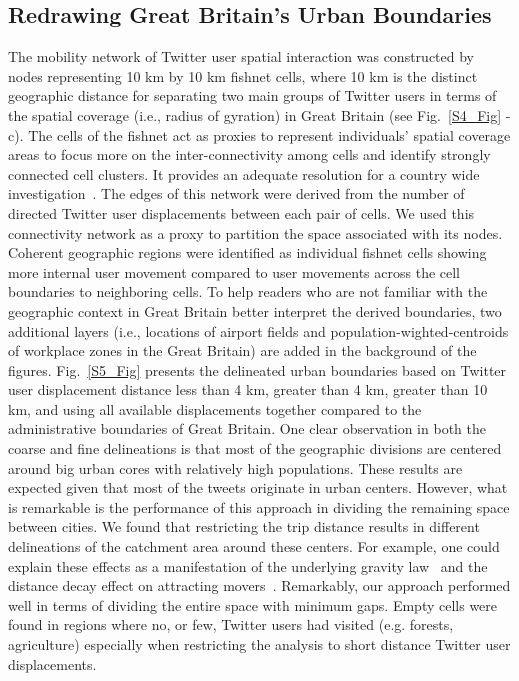 \documentclass[]{tGIS2e}
\begin{document}
\subsection{Redrawing Great Britain's Urban Boundaries}
The mobility network of Twitter user spatial interaction was constructed by nodes representing 10 km by 10 km fishnet cells, where 10 km is the distinct geographic distance for separating two main groups of Twitter users in terms of the spatial coverage (i.e., radius of gyration) in Great Britain (see Fig.~\ref{S4_Fig} - c).
The cells of the fishnet act as proxies to represent individuals' spatial coverage areas to focus more on the inter-connectivity among cells and identify strongly connected cell clusters.
It provides an adequate resolution for a country wide investigation~\citep{ratti2010}.
The edges of this network were derived from the number of directed Twitter user displacements between each pair of cells.
We used this connectivity network as a proxy to partition the space associated with its nodes.
Coherent geographic regions were identified as individual fishnet cells showing more internal user movement compared to user movements across the cell boundaries to neighboring cells.
To help readers who are not familiar with the geographic context in Great Britain better interpret the derived boundaries, two additional layers (i.e., locations of airport fields and population-wighted-centroids of workplace zones in the Great Britain) are added in the background of the figures.
Fig.~\ref{S5_Fig} presents the delineated urban boundaries based on Twitter user displacement distance less than 4 km, greater than 4 km, greater than 10 km, and using all available displacements together compared to the administrative boundaries of Great Britain.
One clear observation in both the coarse and fine delineations is that most of the geographic divisions are centered around big urban cores with relatively high populations.
These results are expected given that most of the tweets originate in urban centers.
However, what is remarkable is the performance of this approach in dividing the remaining space between cities.
We found that restricting the trip distance results in different delineations of the catchment area around these centers.
For example, one could explain these effects as a manifestation of the underlying gravity law~\citep{simini2012} and the distance decay effect on attracting movers~\citep{gonzalez2008}.
Remarkably, our approach performed well in terms of dividing the entire space with minimum gaps.
Empty cells were found in regions where no, or few, Twitter users had visited (e.g. forests, agriculture) especially when restricting the analysis to short distance Twitter user displacements.
\end{document}
